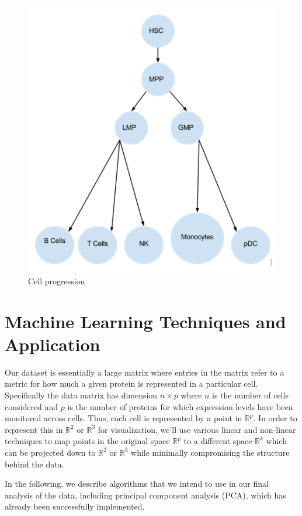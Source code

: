 \documentclass{article} %
\begin{document}
\begin{figure}[H]
  \centering
    \includegraphics[width=120mm]{cell_types_flow_chart.jpg}
    \caption{Cell progression}
    \label{figure:cellEvolution}
\end{figure}


\section{Machine Learning Techniques and Application}
\label{MLalgorithms}

Our dataset is essentially a large matrix where entries in the matrix refer to a metric for how much a given protein is represented in a particular cell. Specifically the data matrix has dimension {$ n \times p $} where {$n$} is the number of cells considered and {$ p $} is the number of proteins for which expression levels have been monitored across cells. Thus, each cell is represented by a point in {$ \mathbb{R}^p $}. In order to represent this in {$\mathbb{R}^2 $} or {$\mathbb{R}^3$} for visualization, we'll use various linear and non-linear techniques to map points in the original space {$\mathbb{R}^p$} to a different space {$\mathbb{R}^k$} which can be projected down to {$\mathbb{R}^2 $} or {$\mathbb{R}^3$} while minimally compromising the structure behind the data.

In the following, we describe algorithms that we intend to use in our final analysis of the data, including principal component analysis (PCA), which has already been successfully implemented.
\end{document}
